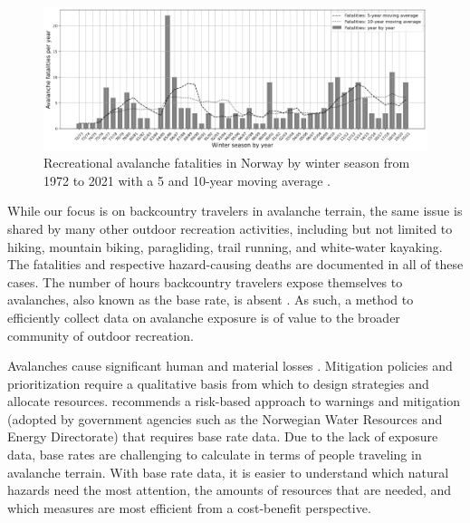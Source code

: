 \documentclass[authordate,empirical, issue]{jote-new-article}
\begin{document}
\begin{figure}
  \begin{fullwidth}


    \includegraphics[width=\linewidth]{media/image1.png}
    \caption{Recreational avalanche fatalities in Norway by winter season from 1972 to 2021 with a 5 and 10-year moving average \parencites{NGI2019}{Varsom2021}.}
    \label{fig:rId8}

  \end{fullwidth}
\end{figure}






While our focus is on backcountry travelers in avalanche terrain, the same issue is shared by many other outdoor recreation activities, including but not limited to hiking, mountain biking, paragliding, trail running, and white-water kayaking. The fatalities and respective hazard-causing deaths are documented in all of these cases. The number of hours backcountry travelers expose themselves to avalanches, also known as the base rate, is absent \parencites{Johnson2020}{Kahneman1973}. As such, a method to efficiently collect data on avalanche exposure is of value to the broader community of outdoor recreation.







Avalanches cause significant human and material losses \parencites{Schweizer2008}. Mitigation policies and prioritization require a qualitative basis from which to design strategies and allocate resources. \textcite{WMO2021} recommends a risk-based approach to warnings and mitigation (adopted by government agencies such as the Norwegian Water Resources and Energy Directorate) that requires base rate data. Due to the lack of exposure data, base rates are challenging to calculate in terms of people traveling in avalanche terrain. With base rate data, it is easier to understand which natural hazards need the most attention, the amounts of resources that are needed, and which measures are most efficient from a cost-benefit perspective.
\end{document}
